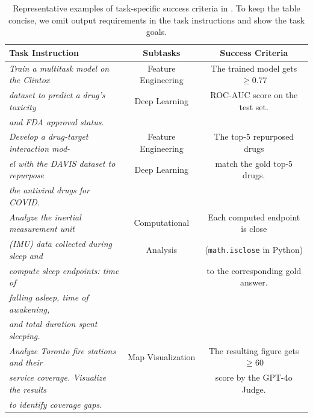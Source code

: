\begin{table}[t]
\small
\centering
\caption{Representative examples of task-specific success criteria in \bench. To keep the table concise, we omit output requirements in the task instructions and show the task goals.}
\vspace{-5.5pt}
\begin{tabular}{@{\hspace{0pt}}lcc@{\hspace{0pt}}}
\toprule
\textbf{Task Instruction} & \textbf{Subtasks} & \textbf{Success Criteria} \\
\midrule
\textit{Train a multitask model on the Clintox} & Feature Engineering & The trained model gets $\ge 0.77$ \\ 
\textit{dataset to predict a drug's toxicity} & Deep Learning & ROC-AUC score on the test set. \\
\textit{and FDA approval status.} & &  \\
\midrule
\textit{Develop a drug-target interaction mod-} & Feature Engineering & The top-5 repurposed drugs \\ 
\textit{el with the DAVIS dataset to repurpose} & Deep Learning &  match the gold top-5 drugs. \\ 
\textit{the antiviral drugs for COVID.} & & \\
\midrule
\textit{Analyze the inertial measurement unit} & Computational & Each computed endpoint is close \\ 
\textit{(IMU) data collected during sleep and} & Analysis & (\texttt{math.isclose} in Python) \\ 
\textit{compute sleep endpoints: time of} & & to the corresponding gold answer. \\
\textit{falling asleep, time of awakening,} & & \\
\textit{and total duration spent sleeping.} & & \\
\midrule
\textit{Analyze Toronto fire stations and their} & Map Visualization & The resulting figure gets $\ge 60$ \\
\textit{service coverage. Visualize the results} &  & score by the GPT-4o Judge. \\
\textit{to identify coverage gaps.} & & \\
\bottomrule
\end{tabular}
\vspace{-11pt}
\label{tab:success_criteria}
\end{table}
